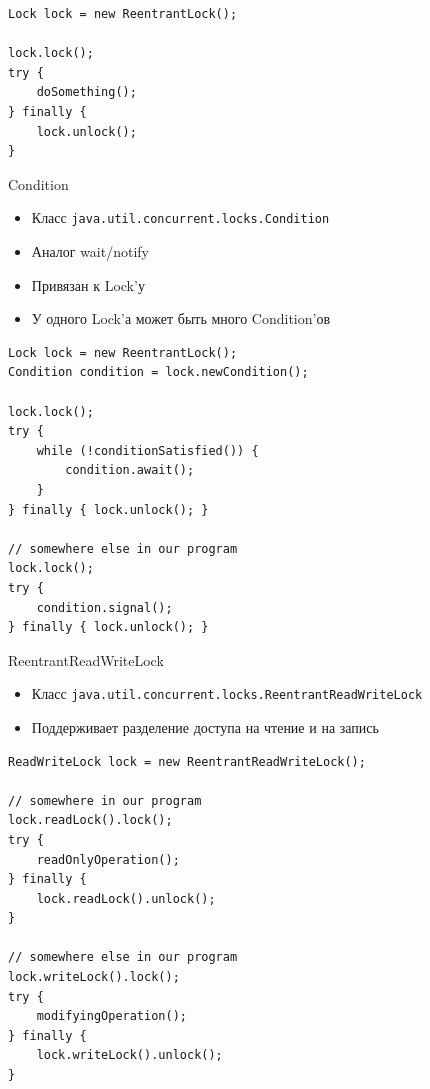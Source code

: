 \documentclass[unicode]{beamer}
\begin{document}
\begin{frame}[fragile]
\begin{lstlisting}
Lock lock = new ReentrantLock();

lock.lock();
try {
    doSomething();
} finally {
    lock.unlock();
}
\end{lstlisting}
\end{frame}


\begin{frame}{Condition}
\begin{itemize}
\item Класс \texttt{java.util.concurrent.locks.Condition}
    \bigskip

\item Аналог wait/notify
    \smallskip

\item Привязан к Lock'у
    \smallskip

\item У одного Lock'а может быть много Condition'ов
\end{itemize}
\end{frame}


\begin{frame}[fragile]
\begin{lstlisting}
Lock lock = new ReentrantLock();
Condition condition = lock.newCondition();

lock.lock();
try {
    while (!conditionSatisfied()) {
        condition.await();
    }
} finally { lock.unlock(); }

// somewhere else in our program
lock.lock();
try {
    condition.signal();
} finally { lock.unlock(); }
\end{lstlisting}
\end{frame}


\begin{frame}{ReentrantReadWriteLock}
\begin{itemize}
\item Класс \texttt{java.util.concurrent.locks.ReentrantReadWriteLock}
    \bigskip

\item Поддерживает разделение доступа на чтение и на запись
\end{itemize}
\end{frame}


\begin{frame}[fragile]
\begin{lstlisting}
ReadWriteLock lock = new ReentrantReadWriteLock();

// somewhere in our program
lock.readLock().lock();
try {
    readOnlyOperation();
} finally {
    lock.readLock().unlock();
}

// somewhere else in our program
lock.writeLock().lock();
try {
    modifyingOperation();
} finally {
    lock.writeLock().unlock();
}
\end{lstlisting}
\end{frame}
\end{document}
